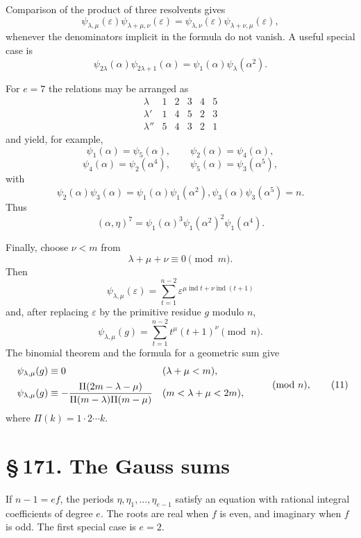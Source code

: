 \documentclass[11pt]{article}
\providecommand{\sect}[2]{\section*{\S\,#1. #2}}
\providecommand{\ind}{\operatorname{ind}}
\begin{document}
Comparison of the product of three resolvents gives
\[
        \psi_{\lambda,
\mu}(\varepsilon)
        \psi_{\lambda+
\mu,
\nu}(\varepsilon)
        =
        \psi_{\lambda,
\nu}(\varepsilon)
        \psi_{\lambda+
\nu,
\mu}(\varepsilon),                       \tag{5}
\]
whenever the denominators implicit in the formula do not vanish. A useful special case is
\[
        \psi_{2\lambda}(\alpha)
        \psi_{2\lambda+1}(\alpha)=
        \psi_1(\alpha)
        \psi_\lambda(\alpha^2).                                      \tag{6}
\]

For $e=7$ the relations may be arranged as
\[
\begin{array}{c|rrrrr}
\lambda&1&2&3&4&5\\ \hline
\lambda'&1&4&5&2&3\\
\lambda''&5&4&3&2&1
\end{array}
\]
and yield, for example,
\[
\psi_1(\alpha)=\psi_5(\alpha),\qquad
\psi_2(\alpha)=\psi_4(\alpha),
\]
\[
\psi_4(\alpha)=\psi_2(\alpha^4),\qquad
\psi_5(\alpha)=\psi_3(\alpha^5),
\]
with
\[
        \psi_2(\alpha)
        \psi_3(\alpha)=\psi_1(\alpha)
        \psi_1(\alpha^2),
        \psi_3(\alpha)
        \psi_3(\alpha^5)=n.
\]
Thus
\[
        (\alpha,
\eta)^7=\psi_1(\alpha)^3
        \psi_1(\alpha^2)^2
        \psi_1(\alpha^4).                                             \tag{7}
\]

Finally, choose $\nu<m$ from
\[
        \lambda+
\mu+
\nu\equiv0\pmod m.                                          \tag{8}
\]
Then
\[
        \psi_{\lambda,
\mu}(\varepsilon)=
        \sum_{t=1}^{n-2}\varepsilon^{\mu\ind t+
\nu\ind(t+1)}          \tag{9}
\]
and, after replacing $\varepsilon$ by the primitive residue $g$ modulo $n$,
\[
        \psi_{\lambda,
\mu}(g)=
        \sum_{t=1}^{n-2} t^\mu(t+1)^\nu \pmod n.                       \tag{10}
\]
The binomial theorem and the formula for a geometric sum give
\[
\begin{array}{ll}
\psi_{\lambda,
\mu}(g)
\equiv0 & (\lambda+
\mu<m),\\[0.5em]
\displaystyle
\psi_{\lambda,
\mu}(g)
\equiv-
{\Pi(2m-
\lambda-
\mu)\over
 \Pi(m-
\lambda)\Pi(m-
\mu)} & (m<\lambda+
\mu<2m),
\end{array}
\qquad\pmod n,                                                       \tag{11}
\]
where $\Pi(k)=1\cdot2\cdots k$.

\sect{171}{The Gauss sums}

If $n-1=ef$, the periods $\eta,
\eta_1,
\ldots,
\eta_{e-1}$ satisfy an equation with rational integral coefficients of degree $e$. The roots are real when $f$ is even, and imaginary when $f$ is odd. The first special case is $e=2$.
\end{document}
